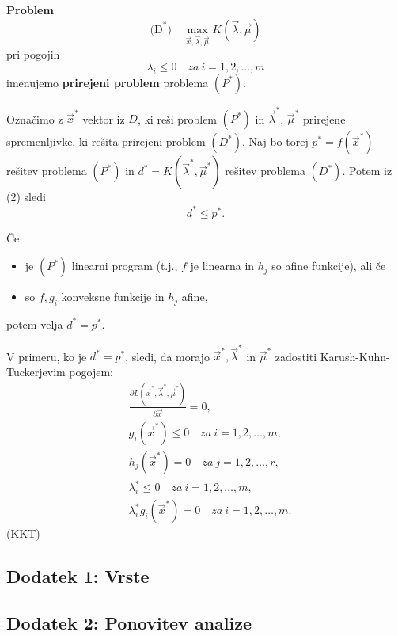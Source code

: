 \documentclass{article}
\begin{document}
\begin{multicols}{2}
	\textbf{Problem}
	\[
		\text{(D}^*\text{)} \quad \max_{\vec{x},\vec{\lambda}, \vec{\mu}} K(\vec{\lambda}, \vec{\mu})
	\]
	pri pogojih
	\[
		\lambda_i \leq 0 \quad za \ i = 1,2,\ldots,m
	\]
	imenujemo \textbf{prirejeni problem} problema \( (P^*) \).

	Označimo z \( \vec{x}^* \) vektor iz \( D \), ki reši problem \( (P^*) \) in \( \vec{\lambda}^* \), \( \vec{\mu}^* \) prirejene spremenljivke, ki rešita prirejeni problem \( (D^*) \). Naj bo torej \( p^* = f(\vec{x}^*) \) rešitev problema \( (P^*) \) in \( d^* = K(\vec{\lambda}^*, \vec{\mu}^*) \) rešitev problema \( (D^*) \). Potem iz (2) sledi
	\[
		d^* \leq p^*.
	\]

	Če
	\begin{itemize}
		\item je \( (P^*) \) linearni program (t.j., \( f \) je linearna in \( h_j \) so afine funkcije), ali če
		\item so \( f, g_i \) konveksne funkcije in \( h_j \) afine,
	\end{itemize}
	potem velja \( d^* = p^* \).

	V primeru, ko je \( d^* = p^* \), sledi, da morajo \( \vec{x}^*, \vec{\lambda}^* \) in \( \vec{\mu}^* \) zadostiti Karush-Kuhn-Tuckerjevim pogojem:
	\[
		\begin{aligned}
			 & \frac{\partial L(\vec{x}^*, \vec{\lambda}^*, \vec{\mu}^*)}{\partial \vec{x}} = 0, \\
			 & g_i(\vec{x}^*) \leq 0 \quad za \ i = 1,2,\ldots,m,                                \\
			 & h_j(\vec{x}^*) = 0 \quad za \ j = 1,2,\ldots,r,                                   \\
			 & \lambda_i^* \leq 0 \quad za \ i = 1,2,\ldots,m,                                   \\
			 & \lambda_i^* g_i(\vec{x}^*) = 0 \quad za \ i = 1,2,\ldots,m.
		\end{aligned}
	\]
	(KKT)


	\subsection{Dodatek 1: Vrste}

	

	\subsection{Dodatek 2: Ponovitev analize}

	

\end{multicols}
\end{document}

